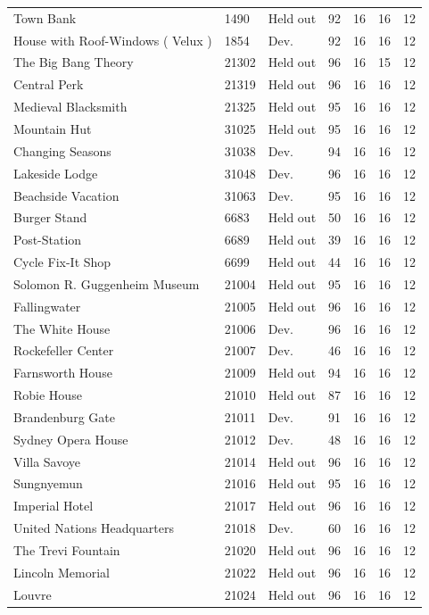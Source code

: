 \begin{longtable}{p{}llrrrr}
Town Bank & 1490 & Held out & 92 & 16 & 16 & 12\\
House with Roof-Windows ( Velux ) & 1854 & Dev. & 92 & 16 & 16 & 12\\
The Big Bang Theory & 21302 & Held out & 96 & 16 & 15 & 12\\
Central Perk & 21319 & Held out & 96 & 16 & 16 & 12\\
Medieval Blacksmith & 21325 & Held out & 95 & 16 & 16 & 12\\
Mountain Hut & 31025 & Held out & 95 & 16 & 16 & 12\\
Changing Seasons & 31038 & Dev. & 94 & 16 & 16 & 12\\
Lakeside Lodge & 31048 & Dev. & 96 & 16 & 16 & 12\\
Beachside Vacation & 31063 & Dev. & 95 & 16 & 16 & 12\\
Burger Stand & 6683 & Held out & 50 & 16 & 16 & 12\\
Post-Station & 6689 & Held out & 39 & 16 & 16 & 12\\
Cycle Fix-It Shop & 6699 & Held out & 44 & 16 & 16 & 12\\
Solomon R. Guggenheim Museum & 21004 & Held out & 95 & 16 & 16 & 12\\
Fallingwater & 21005 & Held out & 96 & 16 & 16 & 12\\
The White House & 21006 & Dev. & 96 & 16 & 16 & 12\\
Rockefeller Center & 21007 & Dev. & 46 & 16 & 16 & 12\\
Farnsworth House & 21009 & Held out & 94 & 16 & 16 & 12\\
Robie House & 21010 & Held out & 87 & 16 & 16 & 12\\
Brandenburg Gate & 21011 & Dev. & 91 & 16 & 16 & 12\\
Sydney Opera House & 21012 & Dev. & 48 & 16 & 16 & 12\\
Villa Savoye & 21014 & Held out & 96 & 16 & 16 & 12\\
Sungnyemun & 21016 & Held out & 95 & 16 & 16 & 12\\
Imperial Hotel & 21017 & Held out & 96 & 16 & 16 & 12\\
United Nations Headquarters & 21018 & Dev. & 60 & 16 & 16 & 12\\
The Trevi Fountain & 21020 & Held out & 96 & 16 & 16 & 12\\
Lincoln Memorial & 21022 & Held out & 96 & 16 & 16 & 12\\
Louvre & 21024 & Held out & 96 & 16 & 16 & 12\\

\end{longtable}
